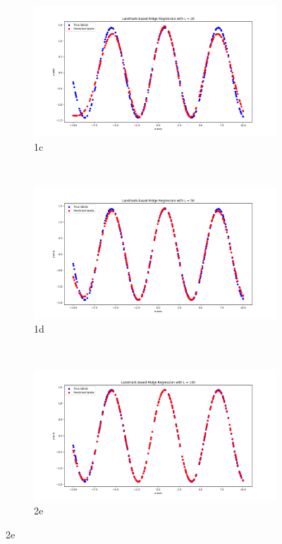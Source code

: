 \documentclass[a4paper,11pt]{article}
\begin{document}
\begin{mlsolution}
\begin{figure}[!htbp]
	\begin{subfigure}{0.5\textwidth}
		\centering
		\includegraphics[width=1.8\textwidth]{images/lrr_L20.png}
		\caption{1c}
		\label{2c}
	\end{subfigure}
	\\
	\begin{subfigure}{0.5\textwidth}
		\centering
		\includegraphics[width=1.8\textwidth]{images/lrr_L50.png}
		\caption{1d}
		\label{2d}
	\end{subfigure}
\\
	\begin{subfigure}{0.5\textwidth}
		\centering
		\includegraphics[width=1.8\textwidth]{images/lrr_L100.png}
		\caption{2e}
		\label{2e}
	\end{subfigure}
\end{figure}


\end{mlsolution}
\end{document}
